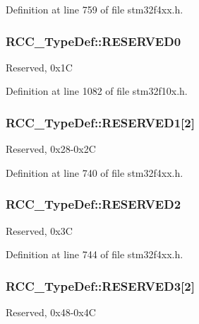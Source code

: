 Definition at line 759 of file stm32f4xx.\-h.

\hypertarget{struct_r_c_c___type_def_a646631532167f3386763a2d10a881a04}{
\subsubsection[{R\-E\-S\-E\-R\-V\-E\-D0}]{ R\-C\-C\-\_\-\-Type\-Def\-::\-R\-E\-S\-E\-R\-V\-E\-D0}}\label{struct_r_c_c___type_def_a646631532167f3386763a2d10a881a04}
Reserved, 0x1\-C 

Definition at line 1082 of file stm32f10x.\-h.

\hypertarget{struct_r_c_c___type_def_a291f9ae23a96c1bfbab257aad87597a5}{
\subsubsection[{R\-E\-S\-E\-R\-V\-E\-D1}]{ R\-C\-C\-\_\-\-Type\-Def\-::\-R\-E\-S\-E\-R\-V\-E\-D1\mbox{[}2\mbox{]}}}\label{struct_r_c_c___type_def_a291f9ae23a96c1bfbab257aad87597a5}
Reserved, 0x28-\/0x2\-C 

Definition at line 740 of file stm32f4xx.\-h.

\hypertarget{struct_r_c_c___type_def_a94cb7e7b923ebacab99c967d0f808235}{
\subsubsection[{R\-E\-S\-E\-R\-V\-E\-D2}]{ R\-C\-C\-\_\-\-Type\-Def\-::\-R\-E\-S\-E\-R\-V\-E\-D2}}\label{struct_r_c_c___type_def_a94cb7e7b923ebacab99c967d0f808235}
Reserved, 0x3\-C 

Definition at line 744 of file stm32f4xx.\-h.

\hypertarget{struct_r_c_c___type_def_a74071ea325d6bc064817ed0a7a4d7def}{
\subsubsection[{R\-E\-S\-E\-R\-V\-E\-D3}]{ R\-C\-C\-\_\-\-Type\-Def\-::\-R\-E\-S\-E\-R\-V\-E\-D3\mbox{[}2\mbox{]}}}\label{struct_r_c_c___type_def_a74071ea325d6bc064817ed0a7a4d7def}
Reserved, 0x48-\/0x4\-C 


